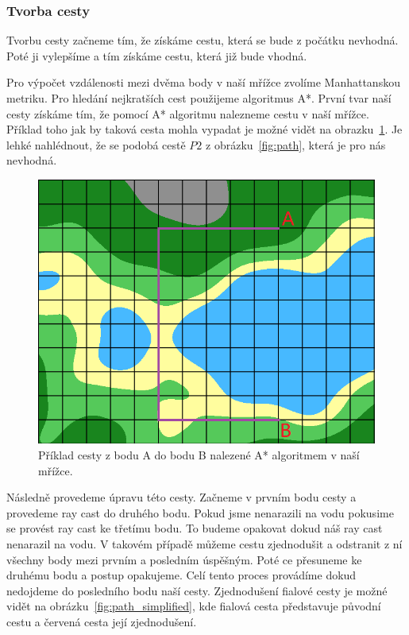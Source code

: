 \subsubsection{Tvorba cesty}
Tvorbu cesty začneme tím, že získáme cestu, která se bude z počátku nevhodná. Poté ji vylepšíme a tím získáme cestu, která již bude vhodná.

Pro výpočet vzdálenosti mezi dvěma body v naší mřížce zvolíme Manhattanskou metriku. Pro hledání nejkratších cest použijeme algoritmus A*. První tvar naší cesty získáme tím, že pomocí A* algoritmu nalezneme cestu v naší mřížce. Příklad toho jak by taková cesta mohla vypadat je možné vidět na obrazku~\ref{fig:path_grid}. Je lehké nahlédnout, že se podobá cestě $P2$ z obrázku~\ref{fig:path}, která je pro nás nevhodná.

\begin{figure}[!htb]
    \centering
    \includegraphics[width=0.66\linewidth]{img/path_grid.png}
    \caption{Příklad cesty z bodu A do bodu B nalezené A* algoritmem v naší mřížce.}
    \label{fig:path_grid}
\end{figure}

Následně provedeme úpravu této cesty. Začneme v prvním bodu cesty a provedeme ray cast do druhého bodu. Pokud jsme nenarazili na vodu pokusime se provést ray cast ke třetímu bodu. To budeme opakovat dokud náš ray cast nenarazil na vodu. V takovém případě můžeme cestu zjednodušit a odstranit z ní všechny body mezi prvním a posledním úspěšným. Poté ce přesuneme ke druhému bodu a postup opakujeme. Celí tento proces provádíme dokud nedojdeme do posledního bodu naší cesty. Zjednodušení fialové cesty je možné vidět na obrázku~\ref{fig:path_simplified}, kde fialová cesta představuje původní cestu a červená cesta její zjednodušení.

